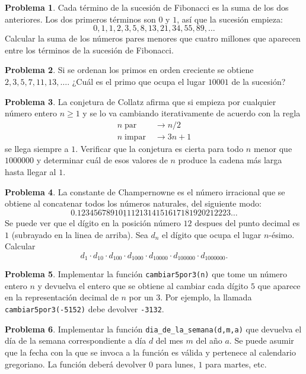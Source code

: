 \documentclass[a4paper, 11pt]{article}
\newcounter{numerodetema}
\theoremstyle{plain}
\theoremstyle{definition}
\newtheorem{prob}{Problema}[numerodetema]
\begin{document}
\begin{prob}\label{prob:fibo}
Cada término de la sucesión de Fibonacci es la suma de los dos anteriores. Los
dos primeros términos son $0$ y $1$, así que la sucesión empieza:
\[
   0, 1, 1, 2, 3, 5, 8, 13, 21, 34, 55, 89, \ldots
\]
Calcular la suma de los números pares menores que cuatro millones que aparecen
entre los términos de la sucesión de Fibonacci.
\end{prob}

\begin{prob}
Si se ordenan los primos en orden creciente se obtiene $2,3,5,7,11,13,\ldots$.
¿Cuál es el primo que ocupa el lugar $10001$ de la sucesión?
\end{prob}

\begin{prob}
La conjetura de Collatz afirma que si empieza por cualquier número entero
$n\geq 1$ y se lo va cambiando iterativamente de acuerdo con la regla
\[
\begin{aligned}
   n\;\text{par}\;&\longrightarrow n/2 \\
   n\;\text{impar}\;&\longrightarrow 3n+1
\end{aligned}
\]
se llega siempre a $1$. Verificar que la conjetura es cierta para todo $n$ menor
que $1000000$ y determinar cuál de esos valores de $n$ produce la cadena más
larga hasta llegar al $1$.
\end{prob}

\begin{prob}
La constante de Champernowne es el número irracional que se obtiene al concatenar
todos los números naturales, del siguiente modo:
\[
   0.12345678910{\underline{1}}1121314151617181920212223\ldots
\]
Se puede ver que el dígito en la posición número $12$ despues del punto
decimal es $1$ (subrayado en la linea de arriba). Sea $d_n$ el dígito que
ocupa el lugar $n$-ésimo. Calcular
\[
   d_1\cdot d_{10}\cdot d_{100}\cdot d_{1000}\cdot d_{10000}\cdot d_{100000}
   \cdot d_{1000000}.
\]
\end{prob}

\begin{prob}
Implementar la función \texttt{cambiar5por3(n)} que tome un número entero $n$ y
devuelva el entero que se obtiene al cambiar cada dígito $5$ que aparece
en la representación decimal de $n$ por un $3$. Por ejemplo, la llamada 
\texttt{cambiar5por3(-5152)} debe devolver \texttt{-3132}.
\end{prob}

\begin{prob}
Implementar la función \texttt{dia\_de\_la\_semana(d,m,a)} que devuelva el
día de la semana correspondiente a día $d$ del mes $m$ del año $a$. Se puede
asumir que la fecha con la que se invoca a la función es válida y pertenece
al calendario gregoriano. La función deberá devolver $0$ para lunes, $1$ para
martes, etc.
\end{prob}
\end{document}
